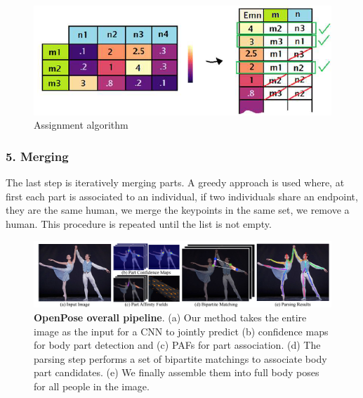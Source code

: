 \begin{figure}[h]
    \centering
    \includegraphics[scale=0.8]{img/OpenPose4.png}
    \caption{Assignment algorithm}
\end{figure}


\subsubsection{5. Merging}
The last step is iteratively merging parts. A greedy approach is used where, at first each part is associated to an individual, if two individuals share an endpoint, they are the same human, we merge the keypoints in the same set, we remove a human. This procedure is repeated until the list is not empty.

\begin{figure}[h]
    \centering
    \includegraphics[scale=0.8]{img/OpenPose5.png}
    \caption{\textbf{OpenPose overall pipeline}. (a) Our method takes the entire image as the input for a CNN to jointly predict (b) confidence maps for body part detection and (c) PAFs for part association. (d) The parsing step performs a set of bipartite matchings to associate body part candidates. (e) We finally assemble them into full body poses for all people in the image.}
\end{figure}

\newpage
